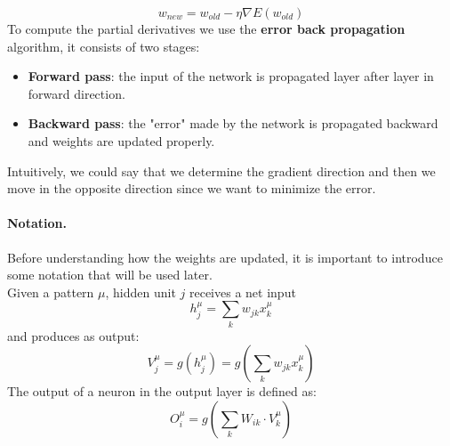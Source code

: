 $$w_{new} = w_{old} - \eta \nabla E(w_{old})$$
To compute the partial derivatives we use the \textbf{error back propagation} algorithm, it consists of two stages:
\begin{itemize}
	\item \textbf{Forward pass}: the input of the network is propagated layer after layer in forward direction.
	\item \textbf{Backward pass}: the "error" made by the network is propagated backward and weights are updated properly.
\end{itemize}
Intuitively, we could say that we determine the gradient direction and then we move in the opposite direction since we want to minimize the error.


\paragraph*{Notation.} Before understanding how the weights are updated, it is important to introduce some notation that will be used later.\\
Given a pattern $\mu$, hidden unit $j$ receives a net input
$$h _ { j } ^ { \mu } = \sum _ { k } w _ { j k } x _ { k } ^ { \mu }$$
and produces as output:
$$V _ { j } ^ { \mu } = g \left( h _ { j } ^ { \mu } \right) = g \left( \sum _ { k } w _ { j k } x _ { k } ^ { \mu } \right)$$
The output of a neuron in the output layer is defined as:
$$O _ {i} ^ {\mu} = g(\sum _ k W_{ik} \cdot V _ {k} ^ {\mu})$$

